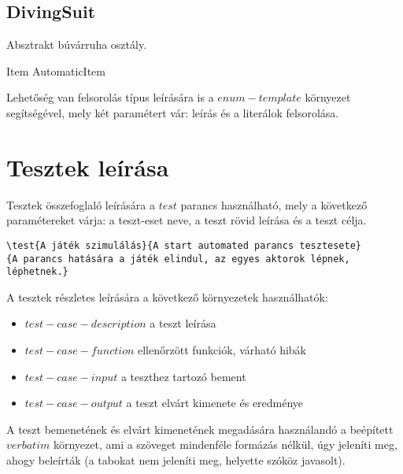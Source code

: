 \documentclass[]{article}
\begin{document}
\subsection*{DivingSuit}
\begin{class-template-responsibility}
    Absztrakt búvárruha osztály.
\end{class-template-responsibility}
\begin{class-template-baseclass}		
    Item \baseclass AutomaticItem
\end{class-template-baseclass}
\begin{class-template-association}
\end{class-template-association}
\begin{class-template-method}
\end{class-template-method}

Lehetőség van felsorolás típus leírására is a $enum-template$ környezet segítségével, mely két paramétert vár: leírás és a literálok felsorolása.

\section{Tesztek leírása}
Tesztek összefoglaló leírására a $test$ parancs használható, mely a következő paramétereket várja: a teszt-eset neve, a teszt rövid leírása és a teszt célja.
\begin{lstlisting}
\test{A játék szimulálás}{A start automated parancs tesztesete}
{A parancs hatására a játék elindul, az egyes aktorok lépnek, léphetnek.}
\end{lstlisting}
\vspace{15px}

A tesztek részletes leírására a következő környezetek használhatók: 
\begin{itemize}
    \item $test-case-description$ a teszt leírása
    \item $test-case-function$ ellenőrzött funkciók, várható hibák
    \item $test-case-input$ a teszthez tartozó bement
    \item $test-case-output$ a teszt elvárt kimenete és eredménye
\end{itemize}
A teszt bemenetének és elvárt kimenetének megadására használandó a beépített $verbatim$ környezet, ami a szöveget mindenféle formázás nélkül, úgy jeleníti meg, ahogy beleírták (a tabokat nem jeleníti meg, helyette szóköz javasolt).
\end{document}

